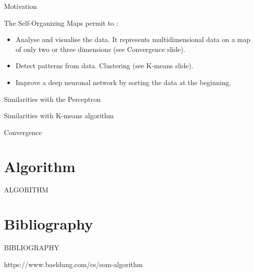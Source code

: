 \documentclass{beamer}
\begin{document}
	
	\begin{frame}{Motivation}

		The Self-Organizing Maps permit to : 

		\begin{itemize}
		
			\item Analyse and visualise the data. It represents multidimensional data on a map of only two or three dimensions (see Convergence slide).

			\item Detect patterns from data. Clustering (see K-means slide).

			\item Improve a deep neuronal network by sorting the data at the beginning.

		\end{itemize}


	\end{frame}
	
		
	\begin{frame}{Similarities with the Perceptron}
	
	\end{frame}
	
	
	\begin{frame}{Similarities with K-means algorithm}
	
	\end{frame}

	
	\begin{frame}{Convergence}
	
	\end{frame}



\section{Algorithm}

	\begin{frame}
	
		\begin{center}
			
			\Huge ALGORITHM
		\end{center}
	\end{frame}










\section{Bibliography}
	
	\begin{frame}
	
		\begin{center}

			\Huge BIBLIOGRAPHY
		\end{center}
	\end{frame}


	\begin{frame}
	
https://www.baeldung.com/cs/som-algorithm
	\end{frame}
\end{document}
